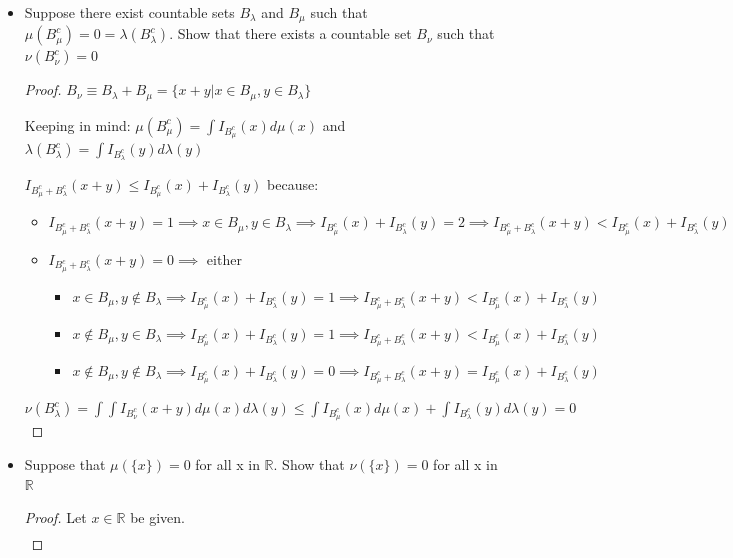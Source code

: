 \documentclass[12pt,letterpaper, onecolumn]{exam}
\newcommand{\real}{\mathbb{R}}
\begin{document}
\begin{questions}
\begin{itemize}
        \item[(c)] Suppose there exist countable sets $B_\lambda$ and $B_\mu$ such that $\mu(B_\mu^c) = 0 = \lambda(B_\lambda^c)$. Show that there exists a countable set $B_\nu$ such that $\nu(B^c_\nu) = 0$ 

        \begin{proof}
            $B_\nu \equiv B_\lambda + B_\mu = \{x + y | x \in B_\mu, y \in B_\lambda\}$

            Keeping in mind: $\mu(B_\mu^c) = \int I_{B_\mu^c}(x) d \mu(x)$ and $\lambda(B_\lambda^c) = \int I_{B_\lambda^c}(y) d \lambda(y)$

            $I_{B_\mu^c + B_\lambda^c}(x+y) \leq I_{B_\mu^c}(x) + I_{B_\lambda^c}(y)$ because:
            \begin{itemize}
            \item $I_{B_\mu^c + B_\lambda^c}(x+y) = 1 \implies x \in B_\mu, y \in B_\lambda \implies I_{B_\mu^c}(x) + I_{B_\lambda^c}(y) = 2 \implies I_{B_\mu^c + B_\lambda^c}(x+y) < I_{B_\mu^c}(x) + I_{B_\lambda^c}(y)$
            \item $I_{B_\mu^c + B_\lambda^c}(x+y) = 0 \implies$ either
            \begin{itemize}
                \item $x \in B_\mu, y \notin B_\lambda \implies I_{B_\mu^c}(x) + I_{B_\lambda^c}(y) = 1 \implies I_{B_\mu^c + B_\lambda^c}(x+y) < I_{B_\mu^c}(x) + I_{B_\lambda^c}(y)$
                \item $x \notin B_\mu, y \in B_\lambda \implies I_{B_\mu^c}(x) + I_{B_\lambda^c}(y) = 1 \implies I_{B_\mu^c + B_\lambda^c}(x+y) < I_{B_\mu^c}(x) + I_{B_\lambda^c}(y)$
                \item $x \notin B_\mu, y \notin B_\lambda \implies I_{B_\mu^c}(x) + I_{B_\lambda^c}(y) = 0 \implies I_{B_\mu^c + B_\lambda^c}(x+y) = I_{B_\mu^c}(x) + I_{B_\lambda^c}(y)$
            \end{itemize}
            \end{itemize}
            $\nu(B_\lambda^c) = \int\int I_{B_\nu^c}(x+y)d\mu(x) d \lambda(y) \leq \int I_{B_\mu^c}(x)d\mu(x) + \int I_{B_\lambda^c}(y)d \lambda(y) = 0$
        \end{proof}
        \item[(d)] Suppose that $\mu(\{x\})= 0$ for all x in $\real$. Show that $\nu(\{x\}) = 0$ for all x in $\real$ 
        \begin{proof}
        Let $x \in \real$ be given.
            \begin{align*}

\end{align*}
\end{proof}
\end{itemize}
\end{questions}
\end{document}
